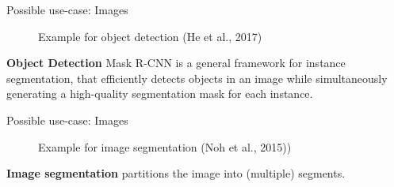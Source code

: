 \documentclass[11pt,compress,t,notes=noshow, xcolor=table]{beamer}
\begin{document}

\begin{frame} {Possible use-case: Images}
\begin{figure}
\centering
{}
\caption{Example for object detection (He et al., 2017)}
\end{figure}
\textbf{Object Detection}
\footnotesize Mask R-CNN is a general framework for instance segmentation, that efficiently detects objects in an image while simultaneously generating a high-quality segmentation mask for each instance.
\end{frame}

\begin{frame} {Possible use-case: Images}
\begin{figure}
\centering
{}
\caption{Example for image segmentation (Noh et al., 2015))} 
\end{figure}
\textbf{Image segmentation} partitions the image into (multiple) segments.
\end{frame}
\end{document}
